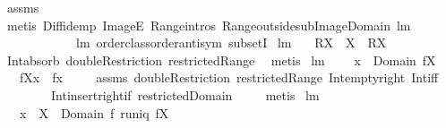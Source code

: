 \begin{isabellebody}
\isamarkupfalse%
\ assms\ \isanewline
\ \ \isamarkupfalse%
\ {\isacharparenleft}metis\ Diff{\isacharunderscore}idemp\ ImageE\ Range{\isachardot}intros\ Range{\isacharunderscore}outside{\isacharunderscore}sub{\isacharunderscore}Image{\isacharunderscore}Domain\ lm{}{}{}\isanewline
\ \ \ \ \ \ \ \ \ \ \ \ lm{}{}{}\ order{\isacharunderscore}class{\isachardot}order{\isachardot}antisym\ subsetI{\isacharparenright}%
\endisatagproof
{\isafoldproof}%
%
\isadelimproof
\isanewline
%
\endisadelimproof
\isanewline
{}\isamarkupfalse%
\ lm{}{}{}{\isacharcolon}\ \isanewline
\ \ {\isachardoublequoteopen}{\isacharparenleft}R{\isacharbar}{\isacharbar}X{\isacharparenright}\ {\isacharbackquote}{\isacharbackquote}\ X\ {\isacharequal}\ R{\isacharbackquote}{\isacharbackquote}X{\isachardoublequoteclose}\ \isanewline
%
\isadelimproof
\ \ %
\endisadelimproof
%
\isatagproof
{}\isamarkupfalse%
\ Int{\isacharunderscore}absorb\ doubleRestriction\ restrictedRange\ \isamarkupfalse%
\ metis%
\endisatagproof
{\isafoldproof}%
%
\isadelimproof
\isanewline
%
\endisadelimproof
\isanewline
{}\isamarkupfalse%
\ lm{}{}{}{\isacharcolon}\ \isanewline
\ \ \ {\isachardoublequoteopen}x\ {\isasymin}\ Domain\ {\isacharparenleft}f{\isacharbar}{\isacharbar}X{\isacharparenright}{\isachardoublequoteclose}\ \isanewline
\ \ \ {\isachardoublequoteopen}{\isacharparenleft}f{\isacharbar}{\isacharbar}X{\isacharparenright}{\isacharbackquote}{\isacharbackquote}{\isacharbraceleft}x{\isacharbraceright}\ {\isacharequal}\ f{\isacharbackquote}{\isacharbackquote}{\isacharbraceleft}x{\isacharbraceright}{\isachardoublequoteclose}\ \isanewline
%
\isadelimproof
\ \ %
\endisadelimproof
%
\isatagproof
{}\isamarkupfalse%
\ assms\ doubleRestriction\ restrictedRange\ Int{\isacharunderscore}empty{\isacharunderscore}right\ Int{\isacharunderscore}iff\ \isanewline
\ \ \ \ \ \ \ \ Int{\isacharunderscore}insert{\isacharunderscore}right{\isacharunderscore}if{}\ restrictedDomain\ \isanewline
\ \ \isamarkupfalse%
\ metis%
\endisatagproof
{\isafoldproof}%
%
\isadelimproof
\isanewline
%
\endisadelimproof
\isanewline
{}\isamarkupfalse%
\ lm{}{}{}{\isacharcolon}\ \isanewline
\ \ \ {\isachardoublequoteopen}x\ {\isasymin}\ X\ {\isasyminter}\ Domain\ f{\isachardoublequoteclose}\ {\isachardoublequoteopen}runiq\ {\isacharparenleft}f{\isacharbar}{\isacharbar}X{\isacharparenright}{\isachardoublequoteclose}\ \isanewline

\end{isabellebody}
